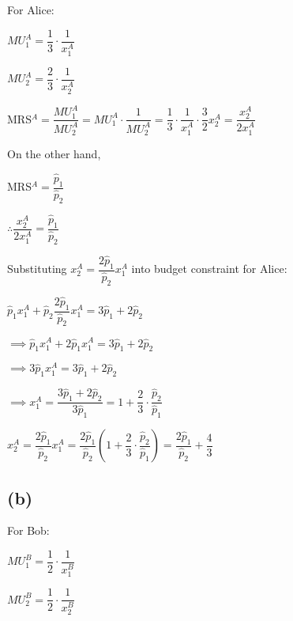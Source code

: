 \documentclass{article}
\begin{document}
For Alice:

$MU^{A}_{1}=\dfrac{1}{3}\cdot\dfrac{1}{x^{A}_{1}}$

$MU^{A}_{2}=\dfrac{2}{3}\cdot\dfrac{1}{x^{A}_{2}}$

MRS$^{A}=\dfrac{MU^{A}_{1}}{MU^{A}_{2}}=MU^{A}_{1}\cdot\dfrac{1}{MU^{A}_{2}}=\dfrac{1}{3}\cdot\dfrac{1}{x^{A}_{1}}\cdot\dfrac{3}{2}x^{A}_{2}=\dfrac{x^{A}_{2}}{2x^{A}_{1}}$

On the other hand, 

MRS$^{A}=\dfrac{\hat{p}_{1}}{\hat{p}_{2}}$

$\therefore \dfrac{x^{A}_{2}}{2x^{A}_{1}}=\dfrac{\hat{p}_{1}}{\hat{p}_{2}}$

Substituting $x^{A}_{2}=\dfrac{2\hat{p}_{1}}{\hat{p}_{2}}x^{A}_{1}$ into budget constraint for Alice:

$\hat{p}_{1}x^{A}_{1}+\hat{p}_{2}\dfrac{2\hat{p}_{1}}{\hat{p}_{2}}x^{A}_{1}=3\hat{p}_{1}+2\hat{p}_{2}$

$\implies \hat{p}_{1}x^{A}_{1}+2\hat{p}_{1}x^{A}_{1}=3\hat{p}_{1}+2\hat{p}_{2}$

$\implies 3\hat{p}_{1}x^{A}_{1}=3\hat{p}_{1}+2\hat{p}_{2}$

$\implies x^{A}_{1}=\dfrac{3\hat{p}_{1}+2\hat{p}_{2}}{3\hat{p}_{1}}=\boxed{1+\dfrac{2}{3}\cdot\dfrac{\hat{p}_{2}}{\hat{p}_{1}}}$

$x^{A}_{2}=\dfrac{2\hat{p}_{1}}{\hat{p}_{2}}x^{A}_{1}=\dfrac{2\hat{p}_{1}}{\hat{p}_{2}}\left(1+\dfrac{2}{3}\cdot\dfrac{\hat{p}_{2}}{\hat{p}_{1}}\right)=\boxed{\dfrac{2\hat{p}_{1}}{\hat{p}_{2}}+\dfrac{4}{3}}$

\subsection*{(b)}


For Bob:

$MU^{B}_{1}=\dfrac{1}{2}\cdot\dfrac{1}{x^{B}_{1}}$

$MU^{B}_{2}=\dfrac{1}{2}\cdot\dfrac{1}{x^{B}_{2}}$
\end{document}
